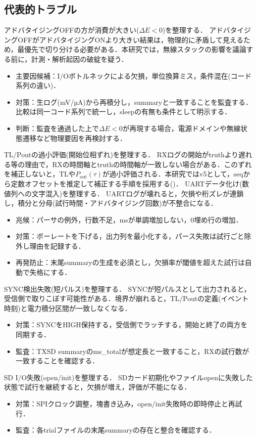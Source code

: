 \subsection{代表的トラブル}
\noindent アドバタイジングOFFの方が消費が大きい($\Delta E<0$)を整理する．
アドバタイジングOFFがアドバタイジングONより大きい結果は，物理的に矛盾して見えるため，最優先で切り分ける必要がある．本研究では，無線スタックの影響を議論する前に，計測・解析起因の破綻を疑う．
\begin{itemize}
  \item 主要因候補：I/Oボトルネックによる欠損，単位換算ミス，条件混在(コード系列の違い)．
  \item 対策：生ログ(mV/µA)から再積分し，summaryと一致することを監査する．比較は同一コード系列で統一し，sleepの有無も条件として明示する．
  \item 判断：監査を通過した上で$\Delta E<0$が再現する場合，電源ドメインや無線状態遷移など物理要因を再検討する．
\end{itemize}
\noindent TL/Poutの過小評価(開始位相ずれ)を整理する．
RXログの開始がtruthより遅れる等の理由で，RXの時間軸とtruthの時間軸が一致しない場合がある．このずれを補正しないと，TLや$P_{\mathrm{out}}(\tau)$が過小評価される．本研究ではv5として，seqから定数オフセットを推定して補正する手順を採用する()．
\noindent UARTデータ化け(数値列への文字混入)を整理する．
UARTログが壊れると，欠損や桁ズレが連鎖し，積分と分母(試行時間・アドバタイジング回数)が不整合になる．
\begin{itemize}
  \item 兆候：パーサの例外，行数不足，msが単調増加しない，0埋め行の増加．
  \item 対策：ボーレートを下げる，出力列を最小化する，パース失敗は試行ごと除外し理由を記録する．
  \item 再発防止：末尾summaryの生成を必須とし，欠損率が閾値を超えた試行は自動で失格にする．
\end{itemize}
\noindent SYNC検出失敗(短パルス)を整理する．
SYNCが短パルスとして出力されると，受信側で取りこぼす可能性がある．境界が崩れると，TL/Poutの定義(イベント時刻)と電力積分区間が一致しなくなる．
\begin{itemize}
  \item 対策：SYNCをHIGH保持する，受信側でラッチする，開始と終了の両方を同期する．
  \item 監査：TXSD summaryのms\_totalが想定長と一致すること，RXの試行数が一致することを確認する．
\end{itemize}
\noindent SD I/O失敗(open/init)を整理する．
SDカード初期化やファイルopenに失敗した状態で試行を継続すると，欠損が増え，評価が不能になる．
\begin{itemize}
  \item 対策：SPIクロック調整，塊書き込み，open/init失敗時の即時停止と再試行．
  \item 監査：各trialファイルの末尾summaryの存在と整合を確認する．
\end{itemize}

